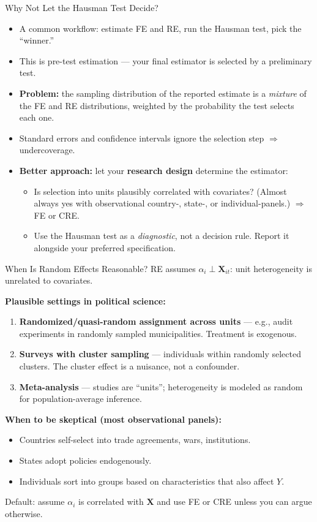 \documentclass[aspectratio=169, handout, t]{beamer}
\numberwithin{equation}{section}
\begin{document}
\begin{frame}{Why Not Let the Hausman Test Decide?}
\begin{itemize}
\item A common workflow: estimate FE and RE, run the Hausman test, pick the ``winner.''
\item This is \alert{pre-test estimation} --- your final estimator is selected by a preliminary test.
\pause
\item \textbf{Problem:} the sampling distribution of the reported estimate is a \emph{mixture} of the FE and RE distributions, weighted by the probability the test selects each one.
\item Standard errors and confidence intervals ignore the selection step $\Rightarrow$ \alert{undercoverage}.
\pause
\item \textbf{Better approach:} let your \textbf{research design} determine the estimator:
\begin{itemize}
\item Is selection into units plausibly correlated with covariates? (Almost always yes with observational country-, state-, or individual-panels.) $\Rightarrow$ FE or CRE.
\item Use the Hausman test as a \emph{diagnostic}, not a decision rule. Report it alongside your preferred specification.
\end{itemize}
\end{itemize}
\end{frame}


\begin{frame}{When Is Random Effects Reasonable?}
RE assumes $\alpha_i \perp \bm{X}_{it}$: unit heterogeneity is unrelated to covariates.\pause

\textbf{Plausible settings in political science:}
\begin{enumerate}\itemsep=1pt
\item \textbf{Randomized/quasi-random assignment across units} --- e.g., audit experiments in randomly sampled municipalities. Treatment is exogenous.
\item \textbf{Surveys with cluster sampling} --- individuals within randomly selected clusters. The cluster effect is a nuisance, not a confounder.
\item \textbf{Meta-analysis} --- studies are ``units''; heterogeneity is modeled as random for population-average inference.
\end{enumerate}\pause

\textbf{When to be skeptical (most observational panels):}
\begin{itemize}\itemsep=1pt
\item Countries self-select into trade agreements, wars, institutions.
\item States adopt policies endogenously.
\item Individuals sort into groups based on characteristics that also affect $Y$.
\end{itemize}
\alert{Default:} assume $\alpha_i$ is correlated with $\bm{X}$ and use FE or CRE unless you can argue otherwise.
\end{frame}
\end{document}
